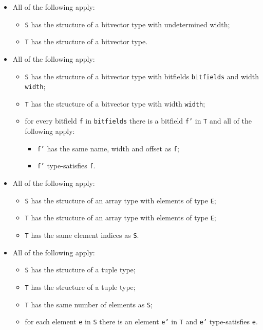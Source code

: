 \documentclass{book}
\begin{document}
\begin{itemize}
  \item All of the following apply:
    \begin{itemize}
    \item \texttt{S} has the structure of a bitvector type with undetermined width;
    \item \texttt{T} has the structure of a bitvector type. 
    \end{itemize}

  \item All of the following apply:
    \begin{itemize}
    \item \texttt{S} has the structure of a bitvector type with bitfields \texttt{bitfields} and width \texttt{width};
    \item \texttt{T} has the structure of a bitvector type with width \texttt{width};
    \item for every bitfield \texttt{f} in \texttt{bitfields} there is a bitfield \texttt{f'} in \texttt{T} and
      all of the following apply:
      \begin{itemize}
      \item \texttt{f'} has the same name, width and offset as \texttt{f};
      \item \texttt{f'} type-satisfies \texttt{f}.
      \end{itemize}
    \end{itemize}

  \item All of the following apply:
    \begin{itemize}
    \item \texttt{S} has the structure of an array type with elements of type \texttt{E};
    \item \texttt{T} has the structure of an array type with elements of type \texttt{E};
    \item \texttt{T} has the same element indices as \texttt{S}.
    \end{itemize}

  \item All of the following apply:
    \begin{itemize}
    \item \texttt{S} has the structure of a tuple type;
    \item \texttt{T} has the structure of a tuple type;
    \item \texttt{T} has the same number of elements as \texttt{S};
    \item for each element \texttt{e} in \texttt{S} there is an element \texttt{e'} in \texttt{T} and \texttt{e'}
      type-satisfies \texttt{e}.
    \end{itemize}  


\end{itemize}
\end{document}

